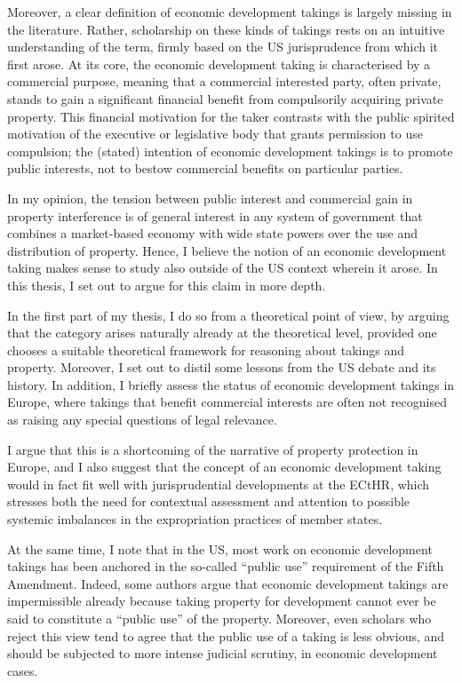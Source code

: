 Moreover, a clear definition of economic development takings is largely missing in the literature. Rather, scholarship on these kinds of takings rests on an intuitive understanding of the term, firmly based on the US jurisprudence from which it first arose. At its core, the economic development taking is characterised by a commercial purpose, meaning that a commercial interested party, often private, stands to gain a significant financial benefit from compulsorily acquiring private property. This financial motivation for the taker contrasts with the public spirited motivation of the executive or legislative body that grants permission to use compulsion; the (stated) intention of economic development takings is to promote public interests, not to bestow commercial benefits on particular parties.

In my opinion, the tension between public interest and commercial gain in property interference is of general interest in any system of government that combines a market-based economy with wide state powers over the use and distribution of property. Hence, I believe the notion of an economic development taking makes sense to study also outside of the US context wherein it arose. In this thesis, I set out to argue for this claim in more depth. 

In the first part of my thesis, I do so from a theoretical point of view, by arguing that the category arises naturally already at the theoretical level, provided one chooses a suitable theoretical framework for reasoning about takings and property. Moreover, I set out to distil some lessons from the US debate and its history. In addition, I briefly assess the status of economic development takings in Europe, where takings that benefit commercial interests are often not recognised as raising any special questions of legal relevance. 

I argue that this is a shortcoming of the narrative of property protection in Europe, and I also suggest that the concept of an economic development taking would in fact fit well with jurisprudential developments at the ECtHR, which stresses both the need for contextual assessment and attention to possible systemic imbalances in the expropriation practices of member states.

At the same time, I note that in the US, most work on economic development takings has been anchored in the so-called ``public use'' requirement of the Fifth Amendment. Indeed, some authors argue that economic development takings are impermissible already because taking property for development cannot ever be said to constitute a ``public use'' of the property. Moreover, even scholars who reject this view tend to agree that the public use of a taking is less obvious, and should be subjected to more intense judicial scrutiny, in economic development cases.


